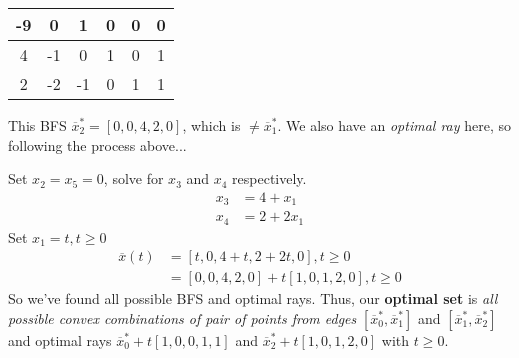 \documentclass[10pt]{article}
\begin{document}
\begin{multicols*}{2}
\begin{minipage}{\columnwidth}
        \begin{tabular}{c|ccccc}
            -9 & 0  & 1  & 0 & 0 & 0 \\
            \hline
            4  & -1 & 0  & 1 & 0 & 1 \\
            2  & -2 & -1 & 0 & 1 & 1
        \end{tabular}

        This BFS \(\overline{x}_2^* = [0, 0, 4, 2, 0]\), which is \(\neq \overline{x}_1^*\).
        We also have an \textit{optimal ray} here, so following the process above...

        Set \(x_2 = x_5 = 0\), solve for \(x_3\) and \(x_4\) respectively.
        \begin{align*}
            x_3 & = 4 + x_1  \\
            x_4 & = 2 + 2x_1
        \end{align*}
        Set \(x_1 = t, t \geq 0\)
        \begin{align*}
            \overline{x}(t) & = [t, 0, 4 + t, 2 + 2t, 0], t \geq 0            \\
                            & = [0, 0, 4, 2, 0] + t [1, 0, 1, 2, 0], t \geq 0
        \end{align*}
        So we've found all possible BFS and optimal rays.
        Thus, our \textbf{optimal set} is
        \textit{all possible convex combinations of pair of points from edges}
        \([\overline{x}_0^*, \overline{x}_1^*]\) and \([\overline{x}_1^*, \overline{x}_2^*]\)
        and optimal rays \(\overline{x}_0^* + t[1, 0, 0, 1, 1]\) and \(\overline{x}_2^* + t[1, 0, 1, 2, 0]\) with \(t \geq 0\).

\end{minipage}
\end{multicols*}
\end{document}
